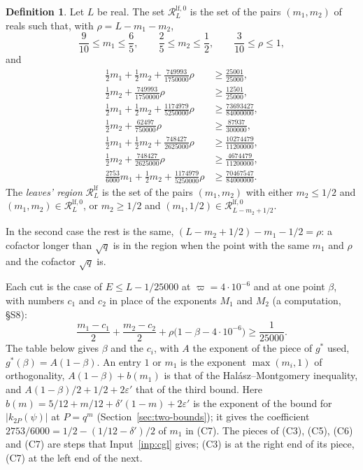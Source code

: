 \documentclass[11pt]{article}
\theoremstyle{definition}
\newtheorem{definition}[theorem]{Definition}
\begin{document}
\begin{definition}\label{def:leaf-region}
Let $L$ be real. The set $\mathcal R^{\mathrm{lf},0}_L$ is the set of the pairs $(m_1, m_2)$ of reals such that, with
$\rho = L - m_1 - m_2$,
\[
  \frac9{10} \le m_1 \le \frac65, \qquad \frac25 \le m_2 \le \frac12, \qquad \frac3{10} \le \rho \le 1,
\]
and
\begin{align*}
  \tfrac12 m_1 + \tfrac12 m_2 + \tfrac{749993}{1750000}\rho &\ge \tfrac{25001}{25000}, \tag*{(C1)} \\
  \tfrac12 m_2 + \tfrac{749993}{1750000}\rho &\ge \tfrac{12501}{25000}, \tag*{(C2)} \\
  \tfrac12 m_1 + \tfrac12 m_2 + \tfrac{1174979}{5250000}\rho &\ge \tfrac{73693427}{84000000}, \tag*{(C3)} \\
  \tfrac12 m_2 + \tfrac{62497}{750000}\rho &\ge \tfrac{87937}{300000}, \tag*{(C4)} \\
  \tfrac12 m_1 + \tfrac12 m_2 + \tfrac{748427}{2625000}\rho &\ge \tfrac{10274479}{11200000}, \tag*{(C5)} \\
  \tfrac12 m_2 + \tfrac{748427}{2625000}\rho &\ge \tfrac{4674479}{11200000}, \tag*{(C6)} \\
  \tfrac{2753}{6000} m_1 + \tfrac12 m_2 + \tfrac{1174979}{5250000}\rho &\ge \tfrac{70467547}{84000000}. \tag*{(C7)}
\end{align*}
The \emph{leaves' region} $\mathcal R^{\mathrm{lf}}_L$ is the set of the pairs $(m_1, m_2)$ with either $m_2 \le 1/2$
and $(m_1, m_2) \in \mathcal R^{\mathrm{lf},0}_L$, or $m_2 \ge 1/2$ and $(m_1, 1/2) \in \mathcal R^{\mathrm{lf},0}_{L -
m_2 + 1/2}$.
\end{definition}

In the second case the rest is the same, $(L - m_2 + 1/2) - m_1 - 1/2 = \rho$: a cofactor longer than $\sqrt q$ is in
the region when the point with the same $m_1$ and $\rho$ and the cofactor $\sqrt q$ is.

Each cut is the case of $E \le L - 1/25000$ at $\varpi = 4 \cdot 10^{-6}$ and at one point $\beta$, with numbers $c_1$
and $c_2$ in place of the exponents $M_1$ and $M_2$ (a computation, \S S8):
\[
  \frac{m_1 - c_1}2 + \frac{m_2 - c_2}2 + \rho\bigl(1 - \beta - 4 \cdot 10^{-6}\bigr) \ge \frac1{25000}.
\]
The table below gives $\beta$ and the $c_i$, with $A$ the exponent of the piece of $g^*$ used, $g^*(\beta) = A(1 -
\beta)$. An entry $1$ or $m_1$ is the exponent $\max(m_i, 1)$ of orthogonality, $A(1 - \beta) + b(m_1)$ is that of the
Hal\'asz--Montgomery inequality, and $A(1 - \beta)/2 + 1/2 + 2\varepsilon'$ that of the third bound. Here $b(m) = 5/12
+ m/12 + \delta'(1 - m) + 2\varepsilon'$ is the exponent of the bound for $|k_{2P}(\psi)|$ at $P = q^m$
(Section~\ref{sec:two-bounds}); it gives the coefficient $2753/6000 = 1/2 - (1/12 - \delta')/2$ of $m_1$ in (C7). The
pieces of (C3), (C5), (C6) and (C7) are steps that Input~\ref{inp:cgl} gives; (C3) is at the right end of its piece,
(C7) at the left end of the next.
\end{document}
